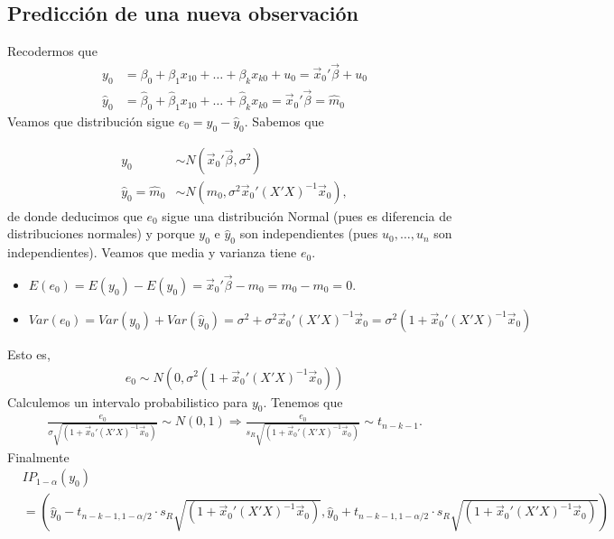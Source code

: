 \subsection{Predicción de una nueva observación}

Recodermos que
\begin{align*}
    y_0           & = \beta_0  + \beta_1 x_{10} + \ldots + \beta_k x_{k0} + u_0 = \vec{x}_0' \vec{\beta} + u_0                                 \\
    \widehat{y}_0 & = \widehat{\beta}_0 + \widehat{\beta}_1 x_{10} + \ldots + \widehat{\beta}_k x_{k0} = \vec{x}_0'\vec{\beta} = \widehat{m}_0
\end{align*}
Veamos que distribución sigue $e_0 = y_0 - \widehat{y}_0$. Sabemos que

\begin{align*}
    y_0                           & \sim N\left( \vec{x}_0' \vec{\beta}, \sigma^2 \right)            \\
    \widehat{y}_0 = \widehat{m}_0 & \sim N\left( m_0, \sigma^2\vec{x}_0'(X'X)^{-1}\vec{x}_0 \right),
\end{align*}
de donde deducimos que $e_0$ sigue una distribución Normal (pues es diferencia de distribuciones normales) y porque $y_0$ e $\widehat{y}_0$ son independientes (pues $u_0,\ldots,u_n$ son independientes). Veamos que media y varianza tiene $e_0$.

\begin{itemize}
    \item $E(e_0) = E(y_0) - E\left(\widehat{y}_0\right) = \vec{x}_0'\vec{\beta} - m_0 = m_0 - m_0 = 0$.
    \item $Var(e_0) = Var(y_0) + Var\left( \widehat{y}_0 \right) = \sigma^2 + \sigma^2\vec{x}_0'(X'X)^{-1}\vec{x}_0 = \sigma^2\left( 1+ \vec{x}_0'(X'X)^{-1}\vec{x}_0 \right)$
\end{itemize}
Esto es,
\begin{align*}
    e_0 \sim N\left(0, \sigma^2\left( 1+ \vec{x}_0'(X'X)^{-1}\vec{x}_0 \right)\right)
\end{align*}
Calculemos un intervalo probabilistico para $y_0$. Tenemos que
\begin{align*}
    \frac{e_0}{\sigma \sqrt{\left( 1+ \vec{x}_0'(X'X)^{-1}\vec{x}_0 \right)}} \sim N(0,1) \Longrightarrow \frac{e_0}{s_R \sqrt{\left( 1+ \vec{x}_0'(X'X)^{-1}\vec{x}_0 \right)}} \sim t_{n-k-1}.
\end{align*}
Finalmente
\begin{align*}
     & IP_{1-\alpha}(y_0)                                                                                                                                                                                                             \\
     & = \left( \widehat{y}_0 - t_{n-k-1,1-\alpha/2} \cdot s_R \sqrt{\left( 1+ \vec{x}_0'(X'X)^{-1}\vec{x}_0 \right)}, \widehat{y}_0 + t_{n-k-1,1-\alpha/2} \cdot s_R \sqrt{\left( 1+ \vec{x}_0'(X'X)^{-1}\vec{x}_0 \right)}  \right)
\end{align*}

